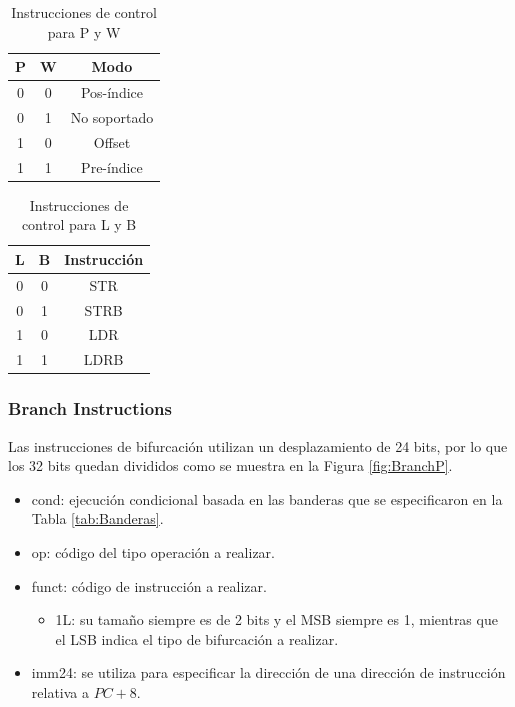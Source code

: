 \documentclass[journal,trans]{IEEEtran}
\begin{document}
	\begin{table}[htbp]
		\centering
		\begin{tabular}{|c|c|c|}
			\hline
			P & W & Modo \\
			\hline
			\hline
			0 & 0 & Pos-índice \\
			\hline
			0 & 1 & No soportado \\
			\hline
			1 & 0 & Offset \\
			\hline
			1 & 1 & Pre-índice \\
			\hline
		\end{tabular}
		\caption{Instrucciones de control para P y W}
		\label{tab:PW}
	\end{table}
	
	\begin{table}[htbp]
		\centering
		\begin{tabular}{|c|c|c|}
			\hline
			L & B & Instrucción \\
			\hline
			\hline
			0 & 0 & STR \\
			\hline
			0 & 1 & STRB \\
			\hline
			1 & 0 & LDR \\
			\hline
			1 & 1 & LDRB \\
			\hline
		\end{tabular}
		\caption{Instrucciones de control para L y B}
		\label{tab:LB}
	\end{table}

	\subsubsection{Branch Instructions}
	Las instrucciones de bifurcación utilizan un desplazamiento de 24 bits, por lo que los 32 bits quedan divididos como se muestra en la Figura \ref{fig:BranchP}.
	
	\begin{itemize}
		\item cond: ejecución condicional basada en las banderas que se especificaron en la Tabla \ref{tab:Banderas}.
		\item op: código del tipo operación a realizar.
		\item funct: código de instrucción a realizar.
		\begin{itemize}
			\item 1L: su tamaño siempre es de 2 bits y el MSB siempre es 1, mientras que el LSB indica el tipo de bifurcación a realizar.
		\end{itemize}
		\item imm24: se utiliza para especificar la dirección de una dirección de instrucción relativa a $PC + 8$.
	\end{itemize}
	
\end{document}
